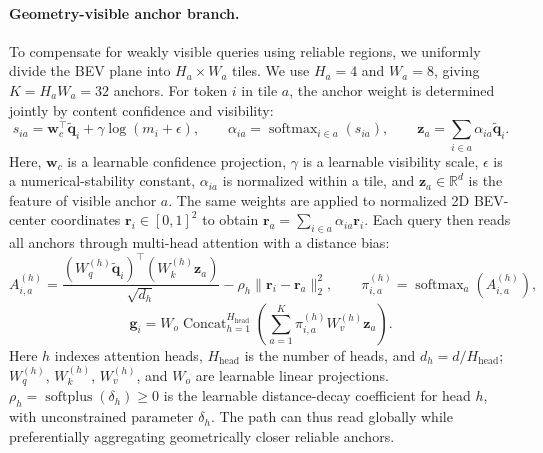 \documentclass[a4paper,fleqn]{cas-sc}
\newcommand{\R}{\mathbb{R}}
\newcommand{\softmax}{\operatorname{softmax}}
\begin{document}
\paragraph{Geometry-visible anchor branch.} To compensate for weakly visible queries using reliable regions, we uniformly divide the BEV plane into $H_a\times W_a$ tiles. We use $H_a=4$ and $W_a=8$, giving $K=H_aW_a=32$ anchors. For token $i$ in tile $a$, the anchor weight is determined jointly by content confidence and visibility:
\begin{equation}
s_{ia}=\bm{w}_c^\top\tilde{\bm{q}}_i+\gamma\log(m_i+\epsilon),\qquad
\alpha_{ia}=\softmax_{i\in a}(s_{ia}),\qquad
\bm{z}_a=\sum_{i\in a}\alpha_{ia}\tilde{\bm{q}}_i .
\end{equation}
Here, $\bm{w}_c$ is a learnable confidence projection, $\gamma$ is a learnable visibility scale, $\epsilon$ is a numerical-stability constant, $\alpha_{ia}$ is normalized within a tile, and $\bm{z}_a\in\R^d$ is the feature of visible anchor $a$. The same weights are applied to normalized 2D BEV-center coordinates $\bm{r}_i\in[0,1]^2$ to obtain $\bm{r}_a=\sum_{i\in a}\alpha_{ia}\bm{r}_i$. Each query then reads all anchors through multi-head attention with a distance bias:
\begin{equation}
A_{i,a}^{(h)}=\frac{(W_q^{(h)}\tilde{\bm{q}}_i)^\top(W_k^{(h)}\bm{z}_a)}{\sqrt{d_h}}-\rho_h\|\bm{r}_i-\bm{r}_a\|_2^2,\qquad
\pi_{i,a}^{(h)}=\softmax_a\left(A_{i,a}^{(h)}\right),
\end{equation}
\begin{equation}
\bm{g}_i=W_o\operatorname{Concat}_{h=1}^{H_{\mathrm{head}}}
\left(\sum_{a=1}^{K}\pi_{i,a}^{(h)}W_v^{(h)}\bm{z}_a\right).
\end{equation}
Here $h$ indexes attention heads, $H_{\mathrm{head}}$ is the number of heads, and $d_h=d/H_{\mathrm{head}}$; $W_q^{(h)}$, $W_k^{(h)}$, $W_v^{(h)}$, and $W_o$ are learnable linear projections. $\rho_h=\operatorname{softplus}(\delta_h)\geq0$ is the learnable distance-decay coefficient for head $h$, with unconstrained parameter $\delta_h$. The path can thus read globally while preferentially aggregating geometrically closer reliable anchors.
\end{document}
